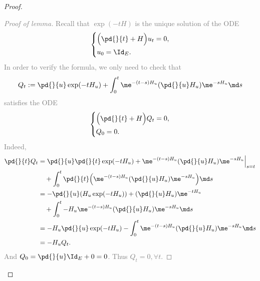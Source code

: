 \begin{proof}
    \textcolor{gray}{
    \begin{proof}[Proof of lemma]
        Recall that $\exp(-tH)$ is the unique solution of the ODE
        \begin{equation*}
            \left\{
            \begin{aligned}
                &\Big(\pd{}{t}+H\Big)u_t=0, \\
                &u_0=\Id_E.
            \end{aligned}
            \right.
        \end{equation*}
        In order to verify the formula, we only need to check that
        \begin{equation*}
            Q_t:=\pd{}{u}\exp(-tH_u)
            +\int_0^t\me^{-(t-s)H_u}(\pd{}{u}H_u)\me^{-sH_u}\md s
        \end{equation*}
        satisfies the ODE 
        \begin{equation*}
            \left\{
            \begin{aligned}
                &\Big(\pd{}{t}+H\Big)Q_t=0, \\
                &Q_0=0.
            \end{aligned}
            \right.
        \end{equation*}
        Indeed,
        \begin{align*}
            \pd{}{t}Q_t &= \pd{}{u}\pd{}{t}\exp(-tH_u)
            +\me^{-(t-s)H_u}(\pd{}{u}H_u)\me^{-sH_u}\Big|_{s=t} \\
            &\quad+\int_0^t\pd{}{t}\Big(\me^{-(t-s)H_u}(\pd{}{u}H_u)
            \me^{-sH_u}\Big)\md s \\
            &= -\pd{}{u}(H_u\exp(-tH_u)) + (\pd{}{u}H_u)\me^{-tH_u} \\
            &\quad+\int_0^t -H_u\me^{-(t-s)H_u}(\pd{}{u}H_u)\me^{-sH_u}\md s \\
            &= -H_u\pd{}{u}\exp(-tH_u)
            -\int_0^t \me^{-(t-s)H_u}(\pd{}{u}H_u)\me^{-sH_u}\md s \\
            &= -H_u Q_t.
        \end{align*}
        And $Q_0=\pd{}{u}\Id_E+0=0$. Thus $Q_t=0, \forall t$.
    \end{proof}
    }


\end{proof}
